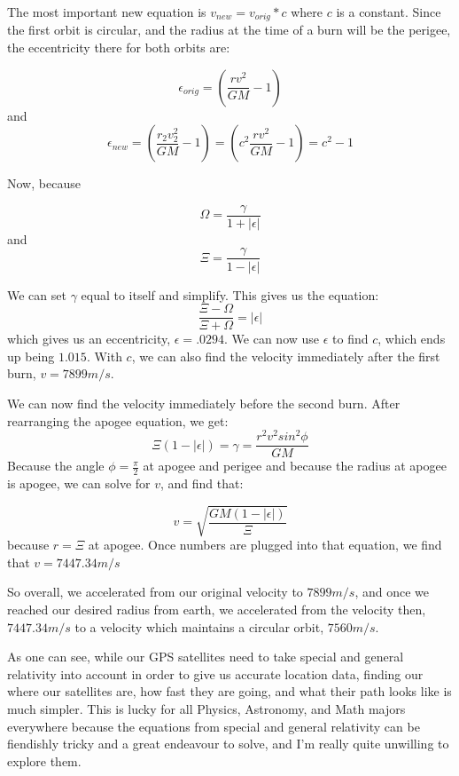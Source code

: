 \documentclass{article}
\begin{document}
The most important new equation is $v_{new} = v_{orig}*c$ where $c$ is a constant.  Since the first orbit is circular, and the radius at the time of a burn will be the perigee, the eccentricity there for both orbits are:

$$\epsilon_{orig} = (\frac{rv^2}{GM} - 1)$$ and $$\epsilon_{new} = (\frac{r_2v_2^2}{GM} - 1) = (c^2\frac{rv^2}{GM} - 1) = c^2 - 1$$

Now, because 

$$\Omega = \frac{\gamma}{1 + |\epsilon|}$$ and $$\Xi = \frac{\gamma}{1 - |\epsilon|}$$  

We can set $\gamma$ equal to itself and simplify.  This gives us the equation: $$\frac{\Xi - \Omega}{\Xi + \Omega} = |\epsilon|$$ which gives us an eccentricity, $\epsilon = .0294$.  We can now use $\epsilon$ to find $c$, which ends up being $1.015$.  With $c$, we can also find the velocity immediately after the first burn, $v = 7899m/s$.

\smallskip

We can now find the velocity immediately before the second burn.  After rearranging the apogee equation, we get: $$\Xi(1 - |\epsilon|) = \gamma = \frac{r^2v^2sin^2{\phi}}{GM}$$  Because the angle $\phi = \frac{\pi}{2}$ at apogee and perigee and because the radius at apogee is apogee, we can solve for $v$, and find that:

$$v = \sqrt{\frac{GM(1 - |\epsilon|)}{\Xi}}$$ because $r = \Xi$ at apogee.  Once numbers are plugged into that equation, we find that $v = 7447.34 m/s$

So overall, we accelerated from our original velocity to $7899 m/s$, and once we reached our desired radius from earth, we accelerated from the velocity then, $ 7447.34 m/s$ to a velocity which maintains a circular orbit, $7560 m/s$.

\bigskip

As one can see, while our GPS satellites need to take special and general relativity into account in order to give us accurate location data, finding our where our satellites are, how fast they are going, and what their path looks like is much simpler.  This is lucky for all Physics, Astronomy, and Math majors everywhere because the equations from special and general relativity can be fiendishly tricky and a great endeavour to solve, and I'm really quite unwilling to explore them.
\end{document}
